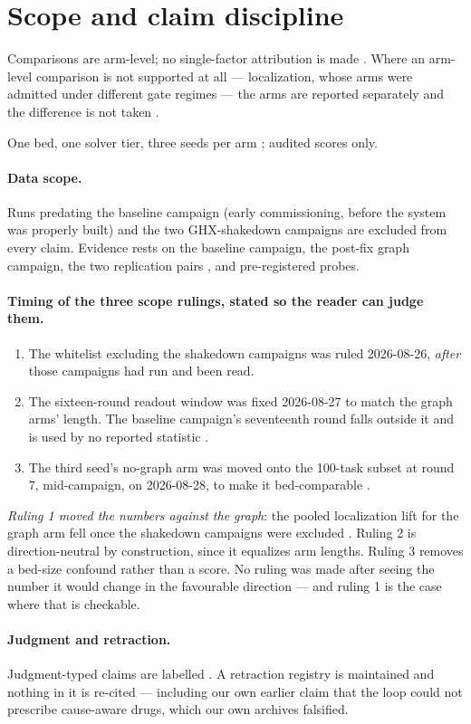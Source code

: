 \section{Scope and claim discipline}
\label{sec:scope}

Comparisons are arm-level; no single-factor attribution is made .
Where an arm-level comparison is not supported at all --- localization,
whose arms were admitted under different gate regimes --- the arms are
reported separately and the difference is not taken .

One bed, one solver tier, three seeds per arm ; audited scores
only.

\paragraph{Data scope.} Runs predating the baseline campaign (early
commissioning, before the system was properly built) and the two
GHX-shakedown campaigns are excluded from every claim. Evidence rests on
the baseline campaign, the post-fix graph campaign, the two replication
pairs , and pre-registered probes.

\paragraph{Timing of the three scope rulings, stated so the reader can
judge them.}
\begin{enumerate}
  \item The whitelist excluding the shakedown campaigns was ruled
        2026-08-26, \emph{after} those campaigns had run and been read.
  \item The sixteen-round readout window was fixed 2026-08-27 to match the
        graph arms' length. The baseline campaign's seventeenth round falls
        outside it and is used by no reported statistic .
  \item The third seed's no-graph arm was moved onto the 100-task subset at
        round 7, mid-campaign, on 2026-08-28, to make it bed-comparable
        .
\end{enumerate}

\emph{Ruling 1 moved the numbers against the graph}: the pooled
localization lift for the graph arm fell once the shakedown campaigns were
excluded . Ruling 2 is direction-neutral by construction, since it
equalizes arm lengths. Ruling 3 removes a bed-size confound rather than a
score. No ruling was made after seeing the number it would change in the
favourable direction --- and ruling 1 is the case where that is checkable.

\paragraph{Judgment and retraction.} Judgment-typed claims are labelled
. A retraction registry is maintained and nothing in it is
re-cited --- including our own earlier claim that the loop could not
prescribe cause-aware drugs, which our own archives falsified.

